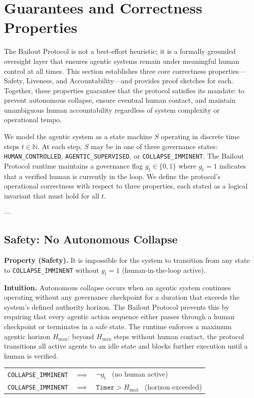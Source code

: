 \section{Guarantees and Correctness Properties}

The Bailout Protocol is not a best-effort heuristic; it is a formally grounded oversight layer that ensures agentic systems remain under meaningful human control at all times. This section establishes three core correctness properties---Safety, Liveness, and Accountability---and provides proof sketches for each. Together, these properties guarantee that the protocol satisfies its mandate: to prevent autonomous collapse, ensure eventual human contact, and maintain unambiguous human accountability regardless of system complexity or operational tempo.

We model the agentic system as a state machine $S$ operating in discrete time steps $t \in \mathbb{N}$. At each step, $S$ may be in one of three governance states: \texttt{HUMAN\_CONTROLLED}, \texttt{AGENTIC\_SUPERVISED}, or \texttt{COLLAPSE\_IMMINENT}. The Bailout Protocol runtime maintains a governance flag $g_t \in \{0, 1\}$ where $g_t = 1$ indicates that a verified human is currently in the loop. We define the protocol's operational correctness with respect to three properties, each stated as a logical invariant that must hold for all $t$.

---

\subsection{Safety: No Autonomous Collapse}

\textbf{Property (Safety).} It is impossible for the system to transition from any state to \texttt{COLLAPSE\_IMMINENT} without $g_t = 1$ (human-in-the-loop active).

\textbf{Intuition.} Autonomous collapse occurs when an agentic system continues operating without any governance checkpoint for a duration that exceeds the system's defined authority horizon. The Bailout Protocol prevents this by requiring that every agentic action sequence either passes through a human checkpoint or terminates in a safe state. The runtime enforces a maximum agentic horizon $H_{\max}$; beyond $H_{\max}$ steps without human contact, the protocol transitions all active agents to an idle state and blocks further execution until a human is verified.

\begin{center}
\begin{tabular}{lcl}
\texttt{COLLAPSE\_IMMINENT} & $\implies$ & $\neg g_t$ \ (no human active) \\
\texttt{COLLAPSE\_IMMINENT} & $\implies$ & $\texttt{Timer} > H_{\max}$ \ (horizon exceeded) \\
\end{tabular}
\end{center}

